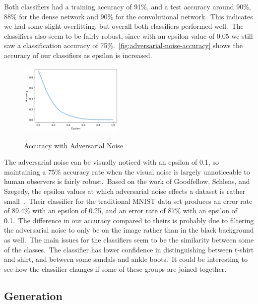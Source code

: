 \documentclass[conference]{IEEEtran}
\begin{document}
    Both classifiers had a training accuracy of 91\%, and a test accuracy around 90\%, 88\% for the dense network and 90\% for the convolutional network.\ This indicates we had some slight overfitting, but overall both classifiers performed well.\ The classifiers also seem to be fairly robust, since with an epsilon value of 0.05 we still saw a classification accuracy of 75\%.~\autoref{fig:adversarial-noise-accuracy} shows the accuracy of our classifiers as epsilon is increased.
    \begin{figure}
        \begin{center}
            \caption{Accuracy with Adversarial Noise}
            \includegraphics[width=0.45\textwidth]{Adversarial Accuracy.png}
            \label{fig:adversarial-noise-accuracy}
        \end{center}
    \end{figure}
    The adversarial noise can be visually noticed with an epsilon of 0.1, so maintaining a 75\% accuracy rate when the visual noise is largely unnoticeable to human observers is fairly robust.\ Based on the work of Goodfellow, Schlens, and Szegedy, the epsilon values at which adversarial noise effects a dataset is rather small~\cite{adversarialexamples}.\ Their classifier for the traditional MNIST data set produces an error rate of 89.4\% with an epsilon of 0.25, and an error rate of 87\% with an epsilon of 0.1.\ The difference in our accuracy compared to theirs is probably due to filtering the adversarial noise to only be on the image rather than in the black background as well.\ The main issues for the classifiers seem to be the similarity between some of the classes.\ The classifier has lower confidence in distinguishing between t-shirt and shirt, and between some sandals and ankle boots.\ It could be interesting to see how the classifier changes if some of these groups are joined together.

    \subsection{Generation}\label{subsec:results-generation}
\end{document}

